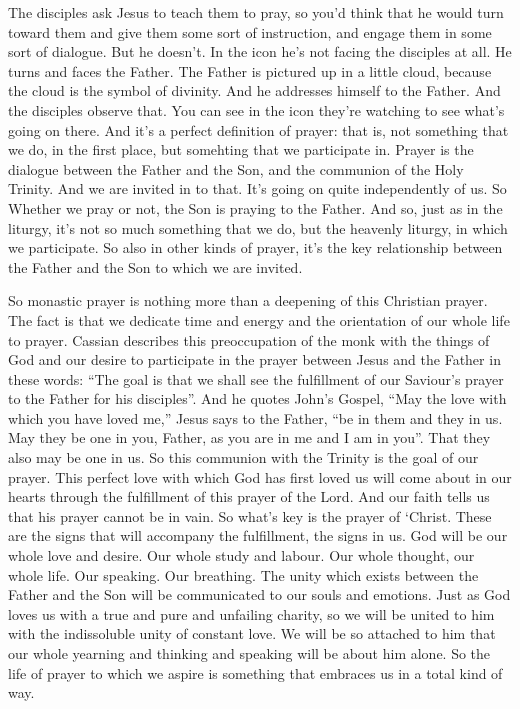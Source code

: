 The disciples ask Jesus to teach them to pray, so you'd think that he would turn toward them and give them some sort of instruction, and engage them in some sort of dialogue. But he doesn't. In the icon he's not facing the disciples at all. He turns and faces the Father. The Father is pictured up in a little cloud, because the cloud is the symbol of divinity. And he addresses himself to the Father. And the disciples observe that. You can see in the icon they're watching to see what's going on there. And it's a perfect definition of prayer: that is, not something that we do, in the first place, but somehting that we participate in. Prayer is the dialogue between the Father and the Son, and the communion of the Holy Trinity. And we are invited in to that. It's going on quite independently of us. So Whether we pray or not, the Son is praying to the Father. And so, just as in the liturgy, it's not so much something that we do, but the heavenly liturgy, in which we participate. So also in other kinds of prayer, it's the key relationship between the Father and the Son to which we are invited.

So monastic prayer is nothing more than a deepening of this Christian prayer. The fact is that we dedicate time and energy and the orientation of our whole life to prayer. Cassian describes this preoccupation of the monk with the things of God and our desire to participate in the prayer between Jesus and the Father in these words: ``The goal is that we shall see the fulfillment of our Saviour's prayer to the Father for his disciples''. And he quotes John's Gospel, ``May the love with which you have loved me,'' Jesus says to the Father, ``be in them and they in us. May they be one in you, Father, as you are in me and I am in you''. That they also may be one in us. So this communion with the Trinity is the goal of our prayer. This perfect love with which God has first loved us will come about in our hearts through the fulfillment of this prayer of the Lord. And our faith tells us that his prayer cannot be in vain. So what's key is the prayer of `Christ. These are the signs that will accompany the fulfillment, the signs in us. God will be our whole love and desire. Our whole study and labour. Our whole thought, our whole life. Our speaking. Our breathing. The unity which exists between the Father and the Son will be communicated to our souls and emotions. Just as God loves us with a true and pure and unfailing charity, so we will be united to him with the indissoluble unity of constant love. We will be so attached to him that our whole yearning and thinking and speaking will be about him alone. So the life of prayer to which we aspire is something that embraces us in a total kind of way.

